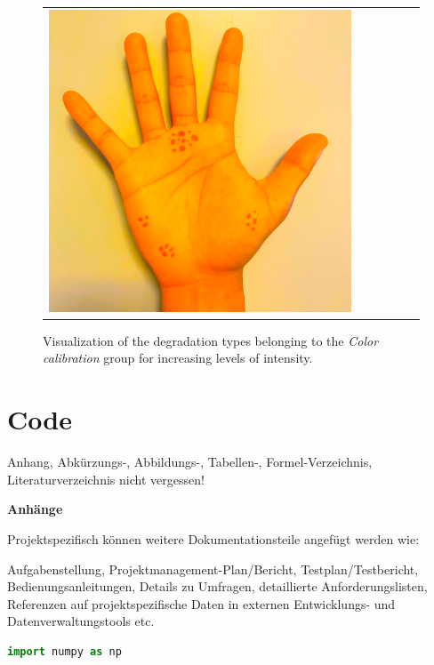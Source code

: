 \begin{figure}
{\begin{tabular}{C{5em}ccccc}
\includegraphics[width=\gridimagewidth,valign=m]{img/supplementary/color_calibration/color_saturation2/0_color_saturation2_4.png} \\ [6.15ex]
        \end{tabular}
    }
    \caption{Visualization of the degradation types belonging to the \textit{Color calibration} group for increasing levels of intensity.}
    \label{fig:color_calibration_supplementary}
\end{figure}


\chapter{Code}
\label{ch:Code}
Anhang, Abkürzungs-, Abbildungs-, Tabellen-, Formel-Verzeichnis, Literaturverzeichnis nicht vergessen!\par
\textbf{Anhänge}

Projektspezifisch können weitere Dokumentationsteile angefügt werden wie:

Aufgabenstellung, Projektmanagement-Plan/Bericht, Testplan/Testbericht, Bedienungsanleitungen, Details zu Umfragen, detaillierte Anforderungslisten, Referenzen auf projektspezifische Daten in externen Entwicklungs- und Datenverwaltungstools etc.
\begin{lstlisting}[caption={Caption on PDF}, label={lst:reference_this}, language=Python]
import numpy as np
\end{lstlisting}